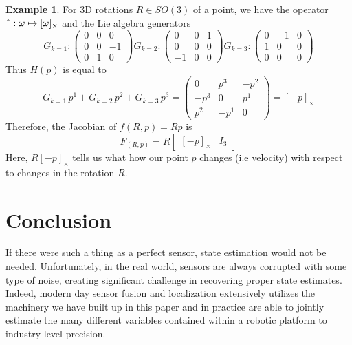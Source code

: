\documentclass[reqno]{amsart}
\theoremstyle{definition}
\newtheorem{exmp}{Example}[section]
\numberwithin{equation}{section}
\begin{document}
\begin{exmp}
    For 3D rotations $R \in SO(3)$ of a point, we have the operator $\string^ : \omega \mapsto [\omega]_{\times}$ and the Lie algebra generators
    \begin{equation*}
        G_{k=1}:\begin{pmatrix}
            0 & 0 & 0 \\
            0 & 0 & -1 \\
            0 & 1 & 0
        \end{pmatrix}
        G_{k=2}:\begin{pmatrix}
            0 & 0 & 1 \\
            0 & 0 & 0 \\
            -1 & 0 & 0
        \end{pmatrix}
        G_{k=3}:\begin{pmatrix}
            0 & -1 & 0 \\
            1 & 0 & 0 \\
            0 & 0 & 0
        \end{pmatrix}
    \end{equation*}
    Thus $H(p)$ is equal to
    \begin{equation*}
        G_{k=1}\,p^1 + G_{k=2}\,p^2 + G_{k=3}\,p^3
        = \begin{pmatrix}
            0 & p^3 & -p^2 \\
            -p^3 & 0 & p^1 \\
            p^2 & -p^1 & 0
        \end{pmatrix} = [-p]_{\times}
    \end{equation*}
    Therefore, the Jacobian of $f(R, p) = Rp$ is
    \begin{equation*}
        F_{(R, p)} = R\begin{bmatrix}
            [-p]_{\times} & I_3
        \end{bmatrix}
    \end{equation*}
    Here, $R[-p]_{\times}$ tells us what how our point $p$ changes (i.e velocity) with respect to changes in the rotation $R$.
\end{exmp}

\section{Conclusion}

If there were such a thing as a perfect sensor, state estimation would not be needed. Unfortunately, in the real world, sensors are always corrupted with some type of noise, creating significant challenge in recovering proper state estimates. Indeed, modern day sensor fusion and localization extensively utilizes the machinery we have built up in this paper and in practice are able to jointly estimate the many different variables contained within a robotic platform to industry-level precision.
\end{document}
